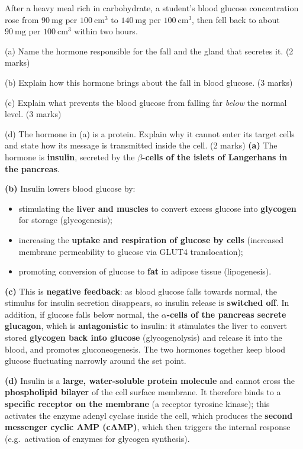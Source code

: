 \documentclass[11pt]{article}
\begin{document}
\begin{exoresolu}
After a heavy meal rich in carbohydrate, a student's blood glucose concentration rose from $90\ \mathrm{mg}$ per $100\ \mathrm{cm^{3}}$ to $140\ \mathrm{mg}$ per $100\ \mathrm{cm^{3}}$, then fell back to about $90\ \mathrm{mg}$ per $100\ \mathrm{cm^{3}}$ within two hours.\par
(a) Name the hormone responsible for the fall and the gland that secretes it. \hfill (2 marks)\par
(b) Explain how this hormone brings about the fall in blood glucose. \hfill (3 marks)\par
(c) Explain what prevents the blood glucose from falling far \emph{below} the normal level. \hfill (3 marks)\par
(d) The hormone in (a) is a protein. Explain why it cannot enter its target cells and state how its message is transmitted inside the cell. \hfill (2 marks)
\tcblower
\textbf{(a)} The hormone is \textbf{insulin}, secreted by the \textbf{$\beta$-cells of the islets of Langerhans in the pancreas}.\par
\textbf{(b)} Insulin lowers blood glucose by:
\begin{itemize}
\item stimulating the \textbf{liver and muscles} to convert excess glucose into \textbf{glycogen} for storage (glycogenesis);
\item increasing the \textbf{uptake and respiration of glucose by cells} (increased membrane permeability to glucose via GLUT4 translocation);
\item promoting conversion of glucose to \textbf{fat} in adipose tissue (lipogenesis).
\end{itemize}
\textbf{(c)} This is \textbf{negative feedback}: as blood glucose falls towards normal, the stimulus for insulin secretion disappears, so insulin release is \textbf{switched off}. In addition, if glucose falls below normal, the \textbf{$\alpha$-cells of the pancreas secrete glucagon}, which is \textbf{antagonistic} to insulin: it stimulates the liver to convert stored \textbf{glycogen back into glucose} (glycogenolysis) and release it into the blood, and promotes gluconeogenesis. The two hormones together keep blood glucose fluctuating narrowly around the set point.\par
\textbf{(d)} Insulin is a \textbf{large, water-soluble protein molecule} and cannot cross the \textbf{phospholipid bilayer} of the cell surface membrane. It therefore binds to a \textbf{specific receptor on the membrane} (a receptor tyrosine kinase); this activates the enzyme adenyl cyclase inside the cell, which produces the \textbf{second messenger cyclic AMP (cAMP)}, which then triggers the internal response (e.g.\ activation of enzymes for glycogen synthesis).
\end{exoresolu}
\end{document}
